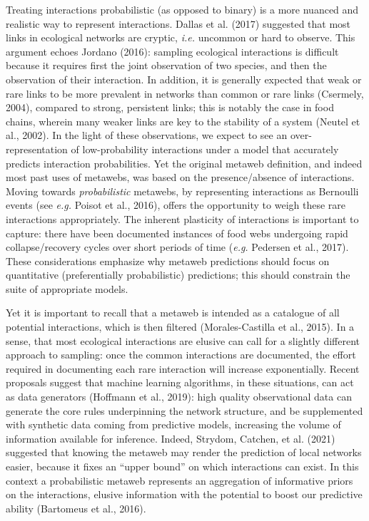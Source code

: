 \documentclass[11pt]{article}
\begin{document}
Treating interactions probabilistic (as opposed to binary) is a more
nuanced and realistic way to represent interactions. Dallas et al.
(2017) suggested that most links in ecological networks are cryptic,
\emph{i.e.} uncommon or hard to observe. This argument echoes Jordano
(2016): sampling ecological interactions is difficult because it
requires first the joint observation of two species, and then the
observation of their interaction. In addition, it is generally expected
that weak or rare links to be more prevalent in networks than common or
rare links (Csermely, 2004), compared to strong, persistent links; this
is notably the case in food chains, wherein many weaker links are key to
the stability of a system (Neutel et al., 2002). In the light of these
observations, we expect to see an over-representation of low-probability
interactions under a model that accurately predicts interaction
probabilities. Yet the original metaweb definition, and indeed most past
uses of metawebs, was based on the presence/absence of interactions.
Moving towards \emph{probabilistic} metawebs, by representing
interactions as Bernoulli events (see \emph{e.g.} Poisot et al., 2016),
offers the opportunity to weigh these rare interactions appropriately.
The inherent plasticity of interactions is important to capture: there
have been documented instances of food webs undergoing rapid
collapse/recovery cycles over short periods of time (\emph{e.g.}
Pedersen et al., 2017). These considerations emphasize why metaweb
predictions should focus on quantitative (preferentially probabilistic)
predictions; this should constrain the suite of appropriate models.

Yet it is important to recall that a metaweb is intended as a catalogue
of all potential interactions, which is then filtered (Morales-Castilla
et al., 2015). In a sense, that most ecological interactions are elusive
can call for a slightly different approach to sampling: once the common
interactions are documented, the effort required in documenting each
rare interaction will increase exponentially. Recent proposals suggest
that machine learning algorithms, in these situations, can act as data
generators (Hoffmann et al., 2019): high quality observational data can
generate the core rules underpinning the network structure, and be
supplemented with synthetic data coming from predictive models,
increasing the volume of information available for inference. Indeed,
Strydom, Catchen, et al. (2021) suggested that knowing the metaweb may
render the prediction of local networks easier, because it fixes an
``upper bound'' on which interactions can exist. In this context a
probabilistic metaweb represents an aggregation of informative priors on
the interactions, elusive information with the potential to boost our
predictive ability (Bartomeus et al., 2016).
\end{document}
